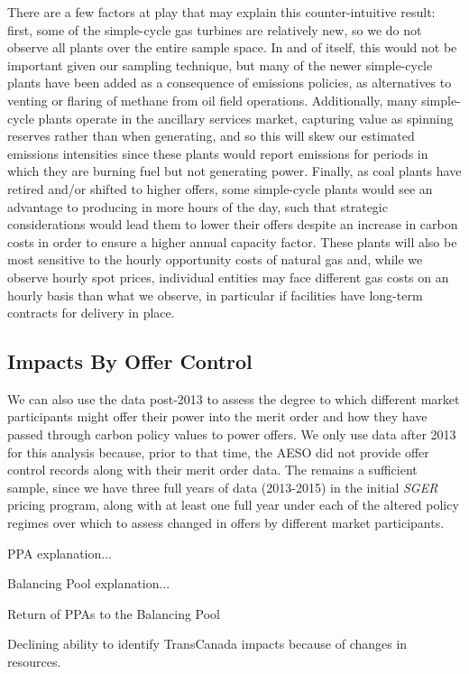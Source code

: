 \documentclass[12pt]{article}
\newcommand{\SGER}{\textit{SGER} }
\begin{document}
There are a few factors at play that may explain this counter-intuitive result: first, some of the simple-cycle gas turbines are relatively new, so we do not observe all plants over the entire sample space. In and of itself, this would not be important given our sampling technique, but many of the newer simple-cycle plants have been added as a consequence of emissions policies, as alternatives to venting or flaring of methane from oil field operations. Additionally, many simple-cycle plants operate in the ancillary services market, capturing value as spinning reserves rather than when generating, and so this will skew our estimated emissions intensities since these plants would report emissions for periods in which they are burning fuel but not generating power. Finally, as coal plants have retired and/or shifted to higher offers, some simple-cycle plants would see an advantage to producing in more hours of the day, such that strategic considerations would lead them to lower their offers despite an increase in carbon costs in order to ensure a higher annual capacity factor. These plants will also be most sensitive to the hourly opportunity costs of natural gas and, while we observe hourly spot prices, individual entities may face different gas costs on an hourly basis than what we observe, in particular if facilities have long-term contracts for delivery in place.


\subsection{Impacts By Offer Control}
We can also use the data post-2013 to assess the degree to which different market participants might offer their power into the merit order and how they have passed through carbon policy values to power offers. We only use data after 2013 for this analysis because, prior to that time, the AESO did not provide offer control records along with their merit order data. The remains a sufficient sample, since we have three full years of data (2013-2015) in the initial \SGER pricing program, along with at least one full year under each of the altered policy regimes over which to assess changed in offers by different market participants.



PPA explanation...

Balancing Pool explanation...

Return of PPAs to the Balancing Pool

Declining ability to identify TransCanada impacts because of changes in resources.
\end{document}
